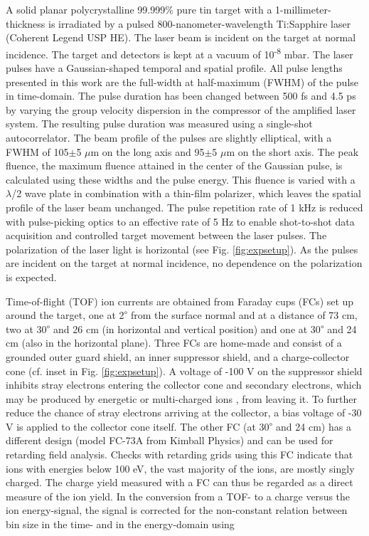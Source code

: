 \documentclass[aip, jap, reprint, amsmath, amssymb]{revtex4-1}
\begin{document}
A solid planar polycrystalline 99.999\% pure tin target with a 1-millimeter-thickness is irradiated by a pulsed 800-nanometer-wavelength Ti:Sapphire laser (Coherent Legend USP HE). The laser beam is incident on the target at normal incidence. The target and detectors is kept at a vacuum of 10\textsuperscript{-8} mbar. The laser pulses have a Gaussian-shaped temporal and spatial profile. All pulse lengths presented in this work are the full-width at half-maximum (FWHM) of the pulse in time-domain. The pulse duration has been changed between 500 fs and 4.5 ps by varying the group velocity dispersion in the compressor of the amplified laser system. The resulting pulse duration was measured using a single-shot autocorrelator. The beam profile of the pulses are slightly elliptical, with a FWHM of 105$\pm$5 $\mu$m on the long axis and 95$\pm$5 $\mu$m on the short axis. The peak fluence, the maximum fluence attained in the center of the Gaussian pulse, is calculated using these widths and the pulse energy. This fluence is varied with a $\lambda$/2 wave plate in combination with a thin-film polarizer, which leaves the spatial profile of the laser beam unchanged. The pulse repetition rate of 1 kHz is reduced with pulse-picking optics to an effective rate of 5 Hz to enable shot-to-shot data acquisition and controlled target movement between the laser pulses. The polarization of the laser light is horizontal (see Fig. \ref{fig:expsetup}). As the pulses are incident on the target at normal incidence, no dependence on the polarization is expected.

Time-of-flight (TOF) ion currents are obtained from Faraday cups (FCs) set up around the target, one at 2\textsuperscript{$\circ$} from the surface normal and at a distance of 73 cm, two at 30\textsuperscript{$\circ$} and 26 cm (in horizontal and vertical position) and one at 30\textsuperscript{$\circ$} and 24 cm (also in the horizontal plane). Three FCs are home-made and consist of a grounded outer guard shield, an inner suppressor shield, and a charge-collector cone (cf. inset in Fig. \ref{fig:expsetup}). A voltage of -100 V on the suppressor shield inhibits stray electrons entering the collector cone and secondary electrons, which may be produced by energetic or multi-charged ions \cite{bodewits2014}, from leaving it. To further reduce the chance of stray electrons arriving at the collector, a bias voltage of -30 V is applied to the collector cone itself. The other FC (at 30\textsuperscript{$\circ$} and 24 cm) has a different design (model FC-73A from Kimball Physics) and can be used for retarding field analysis. Checks with retarding grids using this FC indicate that ions with energies below 100 eV, the vast majority of the ions, are mostly singly charged. The charge yield measured with a FC can thus be regarded as a direct measure of the ion yield. In the conversion from a TOF- to a charge versus the ion energy-signal, the signal is corrected for the non-constant relation between bin size in the time- and in the energy-domain using
\end{document}
